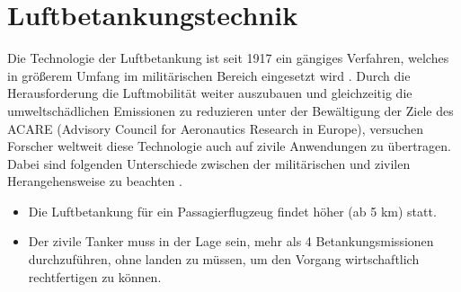 \chapter{Luftbetankungstechnik}\label{cha:SdT}
Die Technologie der Luftbetankung ist seit 1917 ein gängiges Verfahren, welches in größerem Umfang im militärischen Bereich eingesetzt wird \cite{Methoden}. Durch die Herausforderung die Luftmobilität weiter auszubauen und gleichzeitig die umweltschädlichen Emissionen zu reduzieren unter der Bewältigung der Ziele des ACARE (Advisory Council for Aeronautics Research in Europe), versuchen Forscher weltweit diese Technologie auch auf zivile Anwendungen zu übertragen. Dabei sind folgenden Unterschiede zwischen der militärischen und zivilen Herangehensweise zu beachten \cite{CEAS2015}.
\begin{itemize}
   
    \item Die Luftbetankung für ein Passagierflugzeug findet höher (ab 5 km) statt.
    \item Der zivile Tanker muss in der Lage sein, mehr als 4 Betankungsmissionen durchzuführen, ohne landen zu müssen, um den Vorgang wirtschaftlich rechtfertigen zu können.
\end{itemize}

